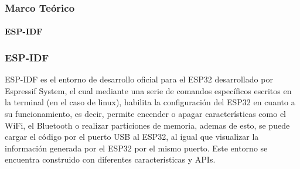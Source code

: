 \begin{frame}
\frametitle{Marco Teórico}
\framesubtitle{ESP-IDF}
\subsubsection{ESP-IDF}

ESP-IDF es el entorno de desarrollo oficial para el ESP32 desarrollado por Espressif System, el cual mediante una serie de comandos específicos escritos en la terminal (en el caso de linux), habilita la configuración del ESP32 en cuanto a su funcionamiento, es decir, permite encender o apagar características como el WiFi, el Bluetooth o realizar particiones de memoria, ademas de esto, se puede cargar el código por el puerto USB al ESP32, al igual que visualizar la información generada por el ESP32 por el mismo puerto. Este entorno se encuentra construido con diferentes características y APIs. \cite{ES}

\end{frame}